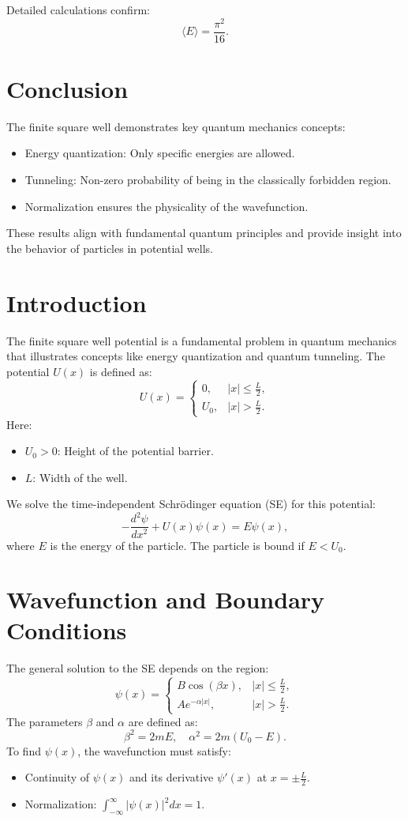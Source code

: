 \documentclass[a4paper,12pt]{article}
\begin{document}
\begin{multicols}{2}
Detailed calculations confirm:
\[
\langle E \rangle = \frac{\pi^2}{16}.
\]

\section{Conclusion}
The finite square well demonstrates key quantum mechanics concepts:
\begin{itemize}
\item Energy quantization: Only specific energies are allowed.
\item Tunneling: Non-zero probability of being in the classically forbidden region.
\item Normalization ensures the physicality of the wavefunction.
\end{itemize}
These results align with fundamental quantum principles and provide insight into the behavior of particles in potential wells.


\section{Introduction}
The finite square well potential is a fundamental problem in quantum mechanics that illustrates concepts like energy quantization and quantum tunneling. The potential \( U(x) \) is defined as:
\[
U(x) = 
\begin{cases} 
0, & |x| \leq \frac{L}{2}, \\ 
U_0, & |x| > \frac{L}{2}.
\end{cases}
\]
Here:
\begin{itemize}
    \item \( U_0 > 0 \): Height of the potential barrier.
    \item \( L \): Width of the well.
\end{itemize}

We solve the time-independent Schrödinger equation (SE) for this potential:
\[
-\frac{d^2\psi}{dx^2} + U(x)\psi(x) = E\psi(x),
\]
where \( E \) is the energy of the particle. The particle is bound if \( E < U_0 \).

\section{Wavefunction and Boundary Conditions}
The general solution to the SE depends on the region:
\[
\psi(x) = 
\begin{cases} 
B\cos(\beta x), & |x| \leq \frac{L}{2}, \\ 
Ae^{-\alpha|x|}, & |x| > \frac{L}{2}.
\end{cases}
\]
The parameters \( \beta \) and \( \alpha \) are defined as:
\[
\beta^2 = 2mE, \quad \alpha^2 = 2m(U_0 - E).
\]
To find \( \psi(x) \), the wavefunction must satisfy:
\begin{itemize}
    \item Continuity of \( \psi(x) \) and its derivative \( \psi'(x) \) at \( x = \pm \frac{L}{2} \).
    \item Normalization: \( \int_{-\infty}^\infty |\psi(x)|^2 dx = 1 \).
\end{itemize}


\end{multicols}
\end{document}
